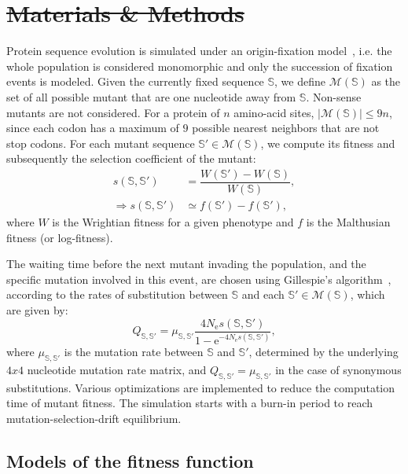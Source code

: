 \documentclass[authoryear]{elsarticle} %
\newcommand{\e}{\text{e}} %
\newcommand{\Ne}{N_{\text{e}}} %
\newcommand{\submatrix}{Q} %
\newcommand{\wrightfit}{W} %
\newcommand{\logfit}{f} %
\newcommand{\NbrSites}{n} %
\newcommand{\Seqi}{\mathbb{S}} %
\newcommand{\Seqj}{\mathbb{S}'} %
\newcommand{\Seqitoj}{\Seqi, \Seqj} %
\newcommand{\Neighbors}{\mathcal{M}} %
\newcommand{\setSeqNeighbors}{\Neighbors\left(\Seqi\right)} %
\providecommand{\DIFaddtex}[1]{{\protect\color{blue}\uwave{#1}}} %
\providecommand{\DIFdeltex}[1]{{\protect\color{red}\sout{#1}}}                      %
\providecommand{\DIFaddbegin}{} %
\providecommand{\DIFaddend}{} %
\providecommand{\DIFdelbegin}{} %
\providecommand{\DIFdelend}{} %
\providecommand{\DIFadd}[1]{\texorpdfstring{\DIFaddtex{#1}}{#1}} %
\providecommand{\DIFdel}[1]{\texorpdfstring{\DIFdeltex{#1}}{}} %
\begin{document}
\section{\DIFdelbegin \DIFdel{Materials \& Methods}\DIFdelend \DIFaddbegin \DIFadd{Appendix}\DIFaddend }
Protein sequence evolution is simulated under an origin-fixation model~\citep{McCandlish2014}, i.e. the whole population is considered monomorphic and only the succession of fixation events is modeled.
Given the currently fixed sequence $\Seqi$, we define $\setSeqNeighbors$ as the set of all possible mutant that are one nucleotide away from $\Seqi$.
Non-sense mutants are not considered.
For a protein of $\NbrSites$ amino-acid sites, $\left| \setSeqNeighbors \right| \leq 9 \NbrSites$, since each {codon} has a maximum of $9$ possible nearest neighbors that are not stop {codons}.
For each mutant sequence $\Seqj \in \setSeqNeighbors$, we compute its fitness and subsequently the selection coefficient of the mutant:
\begin{align}
    s \left( \Seqi,\Seqj\right) & = \dfrac{ \wrightfit \left(\Seqj \right) - \wrightfit \left(\Seqi\right) }{ \wrightfit \left( \Seqi\right)}, \\
    \Rightarrow s \left( \Seqi,\Seqj\right) & \simeq  \logfit \left(\Seqj \right) -   \logfit \left(\Seqj \right),
\end{align}
where $\wrightfit$ is the Wrightian fitness for a given {phenotype} and $\logfit $ is the Malthusian fitness (or log-fitness).

The waiting time before the next mutant invading the population, and the specific mutation involved in this event, are chosen using Gillespie’s algorithm~\citep{Gillespie1977}, according to the rates of {substitution} between $\Seqi$ and each $\Seqj \in \setSeqNeighbors$, which are given by:
\begin{equation}
    \submatrix_{\Seqitoj} = \mu_{\Seqitoj} \dfrac{4 \Ne s \left( \Seqi,\Seqj\right)}{1 - \e^{-4 \Ne s \left( \Seqi,\Seqj\right)}},
\end{equation}
where $\mu_{\Seqitoj}$ is the mutation rate between $\Seqi$ and $\Seqj$, determined by the underlying $4x4$ nucleotide mutation rate matrix, and ${\submatrix_{\Seqitoj}} = \mu_{\Seqitoj}$ in the case of {synonymous} {substitutions}.
Various optimizations are implemented to reduce the computation time of mutant fitness.
The simulation starts with a burn-in period to reach mutation-selection-drift equilibrium.

\subsection{Models of the fitness function}
\label{MatMet:folding}
\end{document}
